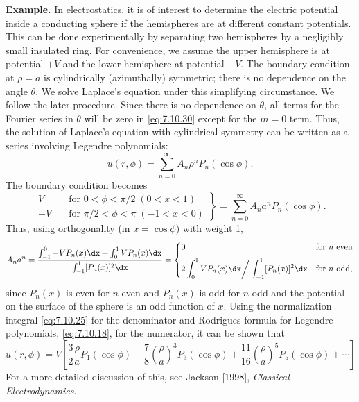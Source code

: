 \textbf{Example.}  In electrostatics, it is of interest to determine the electric potential inside a conducting sphere if the hemispheres are at different constant potentials.  This can be done experimentally by separating two hemispheres by a negligibly small insulated ring.  For convenience, we assume the upper hemisphere is at potential $+V$ and the lower hemisphere at potential $-V$.  The boundary condition at $\rho = a$ is cylindrically (azimuthally) symmetric; there is no dependence on the angle $\theta$.  We solve Laplace's equation under this simplifying circumstance.  We follow the later procedure.  Since there is no dependence on $\theta$, all terms for the Fourier series in $\theta$ will be zero in \eqref{eq:7.10.30} except for the $m = 0$ term.  Thus, the solution of Laplace's equation with cylindrical symmetry can be written as a series involving Legendre polynomials:
\begin{equation}
u(r,\phi) = \sum_{n=0}^{\infty} A_n\rho^n P_n(\cos\phi).
\label{eq:7.10.33}
\end{equation}
The boundary condition becomes
\begin{equation}
\left.
\begin{aligned}
V &\quad\text{for } 0 < \phi < \pi/2 \; (0 < x < 1) \\
-V &\quad\text{for } \pi/2 < \phi < \pi \; (-1 < x < 0)
\end{aligned}
\right\}
= \sum_{n=0}^{\infty} A_n a^n P_n(\cos\phi).
\label{eq:7.10.34}
\end{equation}
Thus, using orthogonality (in $x = \cos\phi$) with weight 1,
\begin{equation}
A_n a^n = \frac{\int_{-1}^{0}-V P_n(x)\dx + \int_0^1 V P_n(x)\dx}{\int_{-1}^1 [P_n(x)]^2\dx}
= \begin{cases}
0 & \text{for $n$ even} \\[6pt]
2\displaystyle\int_0^1 VP_n(x)\dx\bigg/\int_{-1}^1[P_n(x)]^2\dx & \text{for $n$ odd,}
\end{cases}
\label{eq:7.10.35}
\end{equation}
since $P_n(x)$ is even for $n$ even and $P_n(x)$ is odd for $n$ odd and the potential on the surface of the sphere is an odd function of $x$.  Using the normalization integral \eqref{eq:7.10.25} for the denominator and Rodrigues formula for Legendre polynomials, \eqref{eq:7.10.18}, for the numerator, it can be shown that
\begin{equation}
u(r,\phi) = V\left[\frac{3}{2}\frac{\rho}{a}P_1(\cos\phi) - \frac{7}{8}\left(\frac{\rho}{a}\right)^3 P_3(\cos\phi) + \frac{11}{16}\left(\frac{\rho}{a}\right)^5 P_5(\cos\phi) + \cdots\right]
\label{eq:7.10.36}
\end{equation}
For a more detailed discussion of this, see Jackson [1998], \emph{Classical Electrodynamics}.

